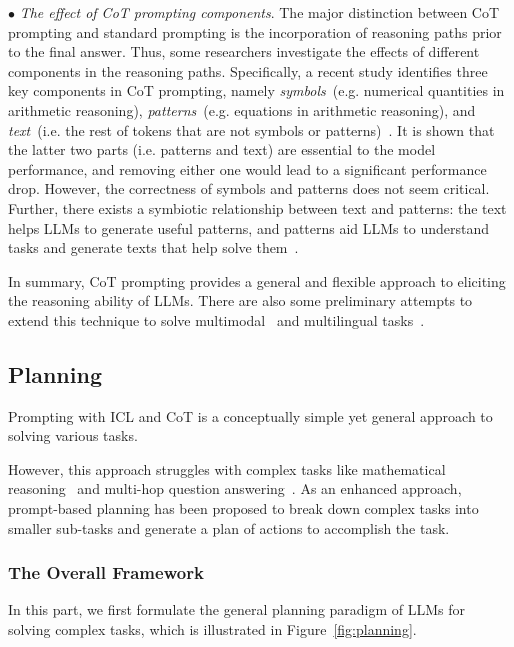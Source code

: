 {{{{{$\bullet$ \emph{The effect of CoT prompting components}. The major distinction between CoT prompting and standard prompting is the incorporation of reasoning paths prior to the final answer. Thus, some researchers investigate the effects of different components in the reasoning paths. Specifically, a recent study identifies three key components in CoT prompting, namely  \emph{symbols}~(e.g. numerical quantities in arithmetic reasoning), \emph{patterns}~(e.g. equations in arithmetic reasoning), and \emph{text}~(i.e. the rest of tokens that are not symbols or patterns)~\cite{Madaan-arxiv-2022-Text}. It is shown that the latter two parts (i.e. patterns and text) are essential to the model performance, and removing either one would lead to a significant performance drop. However, the correctness of symbols and patterns does not seem critical. Further, there exists a symbiotic relationship between text and patterns:   the text helps LLMs to generate useful patterns, and patterns aid LLMs to understand tasks and generate texts that help solve them~\cite{Madaan-arxiv-2022-Text}.

In summary, CoT prompting provides a general and flexible approach to eliciting the reasoning ability of LLMs. There are also some preliminary attempts to extend this technique to solve multimodal~\cite{Zhang-arxiv-2022-Multimodal} and multilingual tasks~\cite{Shi-arxiv-2022-Language}.

\subsection{Planning}
\label{subsec-planning}
Prompting with ICL and CoT is a conceptually simple yet general approach to solving various tasks. 

However, this approach struggles with complex tasks like mathematical reasoning~\cite{Qian-2022-arXiv-limitations} and multi-hop question answering~\cite{Ning-arxiv-2023-ChatGPT}. As an enhanced approach, prompt-based planning has been proposed to break down complex tasks into smaller sub-tasks and generate a plan of actions to accomplish the task.

\subsubsection{The Overall Framework}

In this part, we first formulate the general planning paradigm of LLMs for solving complex tasks, which is illustrated in Figure~\ref{fig:planning}.

}}}}}
